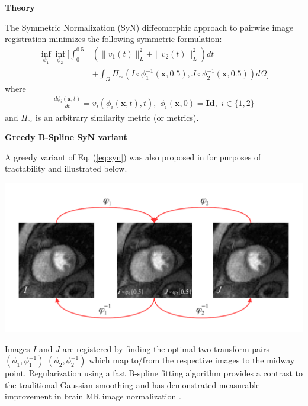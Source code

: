 \documentclass[paperwidth=48in,paperheight=48in,portrait,final]{baposter}
\begin{document}
\begin{poster}
{{\bf Theory}
\vspace{0.5em} 

The Symmetric Normalization (SyN) diffeomorphic approach \cite{avants2008} to pairwise image 
registration minimizes the following symmetric formulation:
\begin{align}
\label{eq:syn}
  \inf_{\phi_1} \inf_{\phi_2}   \Bigg[
                     \int_0^{0.5} & \left( \|v_1(t)\|_L^2 + \|v_2(t)\|_L^2 \right) dt \nonumber \\
                     &+
                     \int_{\Omega} \Pi_{\sim}
                          \left( I \circ \phi_1^{-1}(\mathbf{x},0.5),
                           J \circ \phi_2^{-1}(\mathbf{x},0.5) \right) d\Omega \Bigg]
\end{align}
where
\begin{align}
  \frac{d \phi_i(\mathbf{x},t)}{dt} = v_i( \phi_i(\mathbf{x},t), t ),\,\, \phi_i(\mathbf{x},0) = \mathbf{Id}, \,\, i \in \{1,2\}
\end{align}
and $\Pi_{\sim}$ is an arbitrary similarity metric (or metrics).  

\vspace{0.5em} 
{\bf Greedy B-Spline SyN variant}
\vspace{0.5em} 

A greedy variant of Eq. (\ref{eq:syn})  was also proposed
in \cite{avants2008} for purposes of tractability and illustrated below.
\begin{center}
\includegraphics[width=0.9\linewidth]{../Figures/SyN.pdf}
\end{center}
Images $I$ and $J$ are registered by finding the optimal 
two transform pairs $\left(\phi_1,\phi_1^{-1}\right)$
  $\left(\phi_2,\phi_2^{-1}\right)$ which map to/from
  the respective images to the midway point. 
  Regularization using a fast B-spline fitting algorithm
  provides a contrast to the traditional Gaussian smoothing and has demonstrated
  measurable improvement in brain MR image normalization \cite{tustison2013}.

}
\end{poster}
\end{document}
